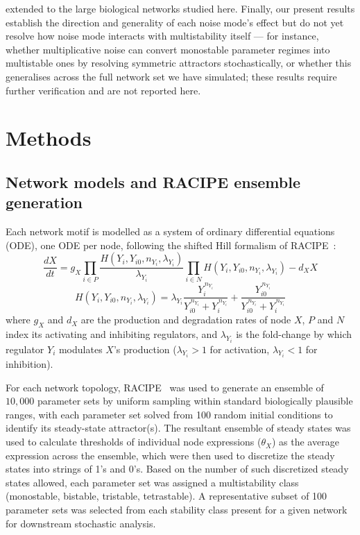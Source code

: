 \documentclass[11pt]{article}
\begin{document}
extended to the large biological networks studied here. Finally, our present results establish the direction and generality of each noise mode's effect but do not yet resolve how noise mode interacts with multistability itself --- for instance, whether multiplicative noise can convert monostable parameter regimes into multistable ones by resolving symmetric attractors stochastically, or whether this generalises across the full network set we have simulated; these results require further verification and are not reported here.

\section{Methods}

\subsection{Network models and RACIPE ensemble generation}\label{sec:RACIPE}

Each network motif is modelled as a system of ordinary differential equations (ODE), one ODE per node, following the shifted Hill formalism of RACIPE~\cite{Huang2017}:
\begin{equation}
\frac{dX}{dt} = g_X \prod_{i \in P} \frac{H(Y_i, Y_{i0}, n_{Y_i}, \lambda_{Y_i})}{\lambda_{Y_i}} \prod_{i \in N} H(Y_i, Y_{i0}, n_{Y_i}, \lambda_{Y_i}) - d_X X
\label{eq:odeM}
\end{equation}
\begin{equation}
H(Y_i, Y_{i0}, n_{Y_i}, \lambda_{Y_i}) = \lambda_{Y_i} \frac{Y_i^{\,n_{Y_i}}}{Y_{i0}^{\,n_{Y_i}} + Y_i^{\,n_{Y_i}}} + \frac{Y_{i0}^{\,n_{Y_i}}}{Y_{i0}^{\,n_{Y_i}} + Y_i^{\,n_{Y_i}}}
\label{eq:hillM}
\end{equation}
where $g_X$ and $d_X$ are the production and degradation rates of node $X$, $P$ and $N$ index its activating and inhibiting regulators, and $\lambda_{Y_i}$ is the fold-change by which regulator $Y_i$ modulates $X$'s production ($\lambda_{Y_i} > 1$ for activation, $\lambda_{Y_i} < 1$ for inhibition).

For each network topology, RACIPE~\cite{Huang2017} was used to generate an ensemble of $10{,}000$ parameter sets by uniform sampling within standard biologically plausible ranges, with each parameter set solved from 100 random initial conditions to identify its steady-state attractor(s). The resultant ensemble of steady states was used to calculate thresholds of individual node expressions ($\theta_X$) as the average expression across the ensemble, which were then used to discretize the steady states into strings of 1's and 0's. Based on the number of such discretized steady states allowed, each parameter set was assigned a multistability class (monostable, bistable, tristable, tetrastable). A representative subset of 100 parameter sets was selected from each stability class present for a given network for downstream stochastic analysis. 
\end{document}
